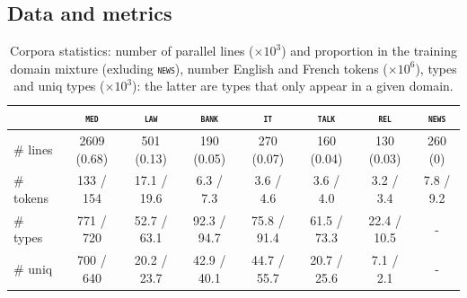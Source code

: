 \documentclass[11pt]{article}
\newcommand{\domain}[1]{\texttt{\textsc{#1}}}
\begin{document}
\subsection{Data and metrics \label{ssec:corpora}}
\begin{table}[htbp]
  \vspace{-\baselineskip}
  \centering \footnotesize
  \begin{tabular}{|l|ccccccc|} %
    \cline{2-8} 
    \multicolumn{1}{c|}{} & \multicolumn{1}{c}{\domain{med}} & \multicolumn{1}{c}{\domain{law}} & \multicolumn{1}{c}{\domain{bank}} & \multicolumn{1}{c}{\domain{it}} & \multicolumn{1}{c}{\domain{talk}} & \multicolumn{1}{c}{\domain{rel}} & \multicolumn{1}{c|}{\domain{news}} \\
    \hline 
    \# lines & 2609 (0.68) & 501 (0.13) & 190 (0.05) & 270 (0.07) & 160 (0.04) & 130 (0.03) & 260 (0) \\
    \# tokens &  133 / 154  &  17.1 / 19.6 &  6.3 / 7.3 &  3.6 / 4.6 &  3.6 / 4.0 &  3.2 / 3.4 & 7.8 / 9.2   \\
    \# types & 771 / 720 & 52.7 / 63.1 & 92.3 / 94.7 & 75.8 / 91.4 & 61.5 / 73.3 & 22.4 / 10.5 & - \\
    \# uniq & 700 / 640 & 20.2 / 23.7 & 42.9 / 40.1 & 44.7 / 55.7 & 20.7 / 25.6 & 7.1 / 2.1 & - \\
    \hline
  \end{tabular}
  \caption{Corpora statistics: number of parallel lines ($\times 10^3$) and proportion in the training domain mixture (exluding \domain{news}), number English and French tokens ($\times 10^6$), types and uniq types ($\times 10^3$): the latter are types that only appear in a given domain.
  }
  \vspace{-\baselineskip}
\label{tab:Corpora}
\end{table}
\end{document}
